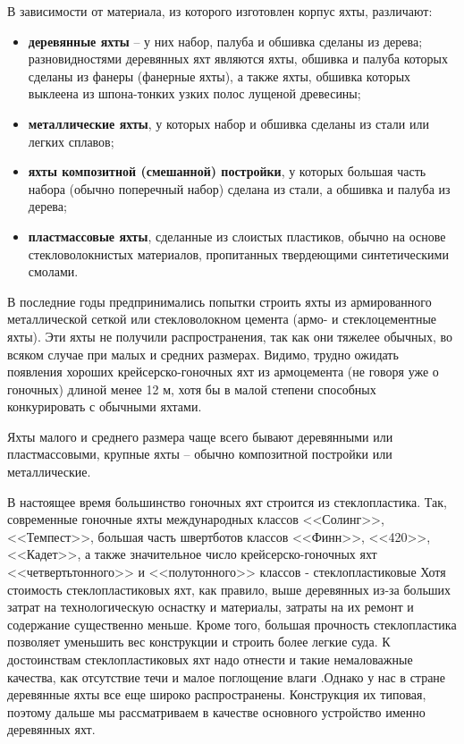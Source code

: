 \documentclass[a4paper, 12pt, twoside, final]{scrbook}
\begin{document}
В зависимости от материала, из которого изготовлен корпус яхты, различают:
\begin{itemize}
\item \textbf{деревянные яхты} \--- у них набор, палуба и обшивка сделаны из
дерева; разновидностями деревянных яхт являются яхты, обшивка и палуба
которых сделаны из фанеры (фанерные яхты), а также яхты, обшивка которых
выклеена из шпона-тонких узких полос лущеной древесины;
\item \textbf{металлические яхты}, у которых набор и обшивка сделаны из
стали или легких сплавов;
\item \textbf{яхты композитной (смешанной) постройки}, у которых большая
часть набора (обычно поперечный набор) сделана из стали, а обшивка
и палуба из дерева;
\item \textbf{пластмассовые яхты}, сделанные из слоистых пластиков, обычно
на основе стекловолокнистых материалов, пропитанных твердеющими синтетическими
смолами.
\end{itemize}
В последние годы предпринимались попытки строить яхты из армированного
металлической сеткой или стекловолокном цемента (армо- и стеклоцементные
яхты). Эти яхты не получили распространения, так как они тяжелее обычных,
во всяком случае при малых и средних размерах. Видимо, трудно ожидать
появления хороших крейсерско-гоночных яхт из армоцемента (не говоря
уже о гоночных) длиной менее 12 м, хотя бы в малой степени способных
конкурировать с обычными яхтами.

Яхты малого и среднего размера чаще всего бывают деревянными или пластмассовыми,
крупные яхты \--- обычно композитной постройки или металлические.

В настоящее время большинство гоночных яхт строится из стеклопластика.
Так, современные гоночные яхты международных классов <<Солинг>>, <<Темпест>>,
большая часть швертботов классов <<Финн>>, <<420>>, <<Кадет>>, а также значительное
число крейсерско-гоночных яхт <<четвертьтонного>> и <<полутонного>> классов
- стеклопластиковые Хотя стоимость стеклопластиковых яхт, как правило,
выше деревянных из-за больших затрат на технологическую оснастку и
материалы, затраты на их ремонт и содержание существенно меньше. Кроме
того, большая прочность стеклопластика позволяет уменьшить вес конструкции
и строить более легкие суда. К достоинствам стеклопластиковых яхт
надо отнести и такие немаловажные качества, как отсутствие течи и
малое поглощение влаги .Однако у нас в стране деревянные яхты все
еще широко распространены. Конструкция их типовая, поэтому дальше
мы рассматриваем в качестве основного устройство именно деревянных
яхт.
\end{document}
